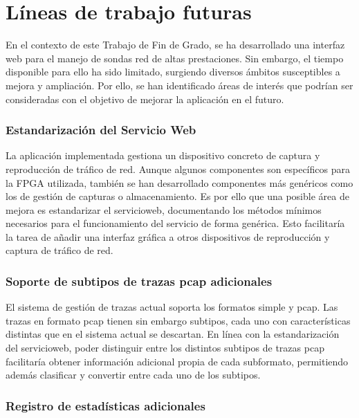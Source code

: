 \chapter{Líneas de trabajo futuras\label{cap:lineas_de_trabajo_futuras}}

En el contexto de este Trabajo de Fin de Grado, se ha desarrollado una interfaz web para el manejo de sondas red de altas prestaciones. Sin embargo, el tiempo disponible para ello ha sido limitado, surgiendo diversos ámbitos susceptibles a mejora y ampliación. Por ello, se han identificado áreas de interés que podrían ser consideradas con el objetivo de mejorar la aplicación en el futuro.


\subsection*{Estandarización del Servicio Web}

La aplicación implementada gestiona un dispositivo concreto de captura y reproducción de tráfico de red. Aunque algunos componentes son específicos para la \gls{FPGA} utilizada, también se han desarrollado componentes más genéricos como los de gestión de capturas o almacenamiento. Es por ello que una posible área de mejora es estandarizar el \gls{servicioweb}, documentando los métodos mínimos necesarios para el funcionamiento del servicio de forma genérica. Esto facilitaría la tarea de añadir una interfaz gráfica a otros dispositivos de reproducción y captura de tráfico de red.


\subsection*{Soporte de subtipos de trazas pcap adicionales}

El sistema de gestión de \glspl{traza} actual soporta los formatos \gls{simple} y \gls{pcap}. Las \glspl{traza} en formato \gls{pcap} tienen sin embargo subtipos, cada uno con características distintas que en el sistema actual se descartan. En línea con la estandarización del \gls{servicioweb}, poder distinguir entre los distintos subtipos de \glspl{traza} \gls{pcap} facilitaría obtener información adicional propia de cada subformato, permitiendo además clasificar y convertir entre cada uno de los subtipos.


\subsection*{Registro de estadísticas adicionales}

